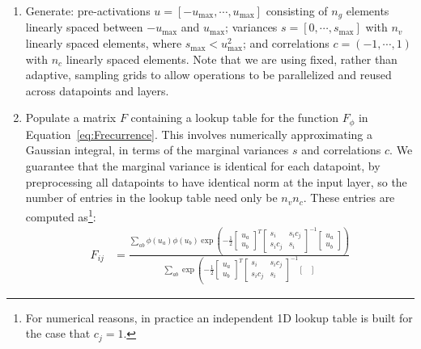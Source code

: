 \documentclass{article} %
\begin{document}
\begin{enumerate}
    \item Generate: pre-activations $u = \left[ -u_{\max}, \cdots, u_{\max} \right]$ consisting of $n_g$ elements linearly spaced between $-u_{\max}$ and $u_{\max}$; variances $s = \left[ 0, \cdots, s_{\max}\right]$ with $n_v$ linearly spaced elements, where $s_{\max} < u_{\max}^2$; and correlations $c = \left( -1, \cdots, 1\right)$ with $n_c$ linearly spaced elements. Note that we are using fixed, rather than adaptive, sampling grids to allow operations to be parallelized and reused across datapoints and layers.
    \item \label{step pop}Populate a matrix $F$ containing a lookup table for the function $F_\phi$ in Equation~\ref{eq:Frecurrence}. This involves numerically approximating a Gaussian integral, in terms of the marginal variances $s$ and correlations $c$. We guarantee that the marginal variance is identical for each datapoint, by preprocessing all datapoints to have identical norm at the input layer, so the number of entries in the lookup table need only be $n_v n_c$. These entries are computed as\footnote{For numerical reasons, in practice an independent 1D lookup table is built for the case that $c_j=1$.}:
    \begin{align}
        F_{ij} &= \frac{\sum_{ab} \phi(u_a) \phi(u_b) \exp\left(
            -\frac{1}{2}\begin{bmatrix}
                u_a \\ u_b
            \end{bmatrix}^T
            \begin{bmatrix}
                s_i & s_i c_j \\
                s_i c_j & s_i
            \end{bmatrix}^{-1}
            \begin{bmatrix}
                u_a \\ u_b
            \end{bmatrix}
            \right)
            }{
            \sum_{ab} \exp\left(
            -\frac{1}{2}\begin{bmatrix}
                u_a \\ u_b
            \end{bmatrix}^T
            \begin{bmatrix}
                s_i & s_i c_j \\
                s_i c_j & s_i
            \end{bmatrix}^{-1}
            \begin{bmatrix}

\end{bmatrix}}
\end{align}
\end{enumerate}
\end{document}
